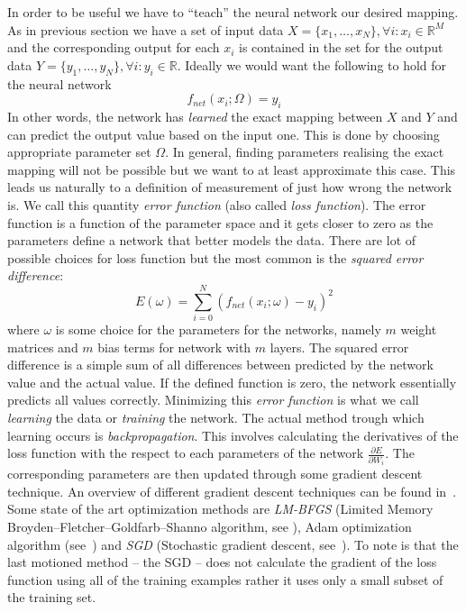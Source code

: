 \documentclass[12pt,a4paper,twoside]{scrartcl}
\numberwithin{equation}{section}
\begin{document}
In order to be useful we have to ``teach'' the neural network our desired mapping. As in previous section we have a set of input data \(X = \{x_1,\ldots , x_N\}, \forall i : x_i\in\mathbb{R}^M\) and the corresponding output for each \(x_i\) is contained in the set for the output data \(Y = \{y_1,\ldots ,y_N\}, \forall i : y_i\in\mathbb{R}\). Ideally we would want the following to hold for the neural network
\begin{equation}
  f_{net}(x_i;\Omega) = y_i
\end{equation}
In other words, the network has \emph{learned} the exact mapping between \(X\) and \(Y\) and can predict the output value based on the input one. This is done by choosing appropriate parameter set \(\Omega\). In general, finding parameters realising the exact mapping will not be possible but we want to at least approximate this case. This leads us naturally to a definition of measurement of just how wrong the network is. We call this quantity \emph{error function} (also called \emph{loss function}). The error function is a function of the parameter space and it gets closer to zero as the parameters define a network that better models the data. There are lot of possible choices for loss function but the most common is the \emph{squared error difference}:
\begin{equation}
  E(\omega) =  \sum_{i=0}^N (f_{net}(x_i;\omega) - y_i)^2
\end{equation}
where \(\omega\) is some choice for the parameters for the networks, namely \(m\) weight matrices and \(m\) bias terms for network with \(m\) layers. The squared error difference is a simple sum of all differences between predicted by the network value and the actual value. If the defined function is zero, the network essentially predicts all values correctly. Minimizing this \emph{error function} is what we call \emph{learning} the data or \emph{training} the network. The actual method trough which learning occurs is \emph{backpropagation}. This involves calculating the derivatives of the loss function with the respect to each parameters of the network \(\frac{\partial E}{\partial W_i }\). The corresponding parameters are then updated through some gradient descent technique. An overview of different gradient descent techniques can be found in~\cite{ruder2016}. Some state of the art optimization methods are \emph{LM-BFGS} (Limited Memory Broyden–Fletcher–Goldfarb–Shanno algorithm, see \cite{byrd1995}), Adam optimization algorithm (see~\cite{kingma2014}) and \emph{SGD} (Stochastic gradient descent, see~\cite{robbins1951}). To note is that the last motioned method -- the SGD -- does not calculate the gradient of the loss function using all of the training examples rather it uses only a small subset of the training set.
\end{document}
